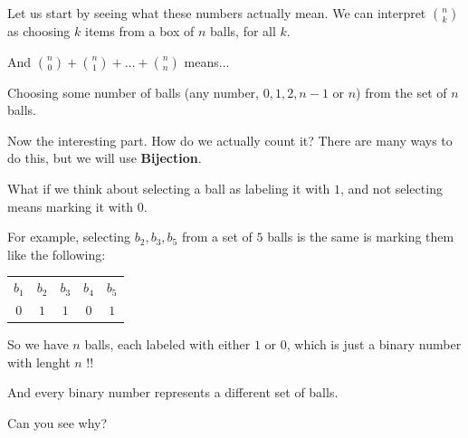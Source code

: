 \documentclass[compress]{beamer}
\begin{document}
\begin{frame}
    Let us start by seeing what these numbers actually mean.
    \textcolor{NordBrightBlue}{We can interpret ${n\choose k}$ as choosing $k$
    items from a box of $n$ balls, for all $k$.} 

    \pause\vspace{1em}

    And ${n \choose 0}+{n \choose 1} + \dots  + {n \choose n}$ means...

    \pause\vspace{1em}
    \begin{center}
        \begin{minipage}{.85\linewidth}
            \textcolor{NordRed}{Choosing some number of balls (any number, $0,
                1, 2, n-1$ or
            $n$) from the set of $n$ balls.}
        \end{minipage}
    \end{center}
    
    \pause \vspace{1em}

    Now the interesting part. How do we actually count it? There are many ways
    to do this, but we will use \textbf{Bijection}.
\end{frame}

\begin{frame}
    \textcolor{NordBrightBlue}{What if we think about selecting a ball as
    labeling it with $1$, and not selecting means marking it with $0$.} 

    \pause\vspace{1em}

    For example, selecting $b_2, b_3, b_5$ from a set of $5$ balls is the same
    is marking them like the following:
    
    \vspace{1em}

    \begin{center}
        \begin{tabular}{ccccc}
            $b_1$ & $b_2$ & $b_3$ & $b_4$ & $b_5$\\
            $0$ & $1$ & $1$ & $0$ & $1$
        \end{tabular}
    \end{center}
\end{frame}

\begin{frame}

    \textcolor{NordRed}{So we have $n$ balls, each labeled with either $1$ or
    $0$, which is just a binary number with lenght $n$   !!}
    
    \vspace{1em}
    And every binary number represents a different set of balls.

    \pause\vspace{1em}

    Can you see why?
\end{frame}
\end{document}
